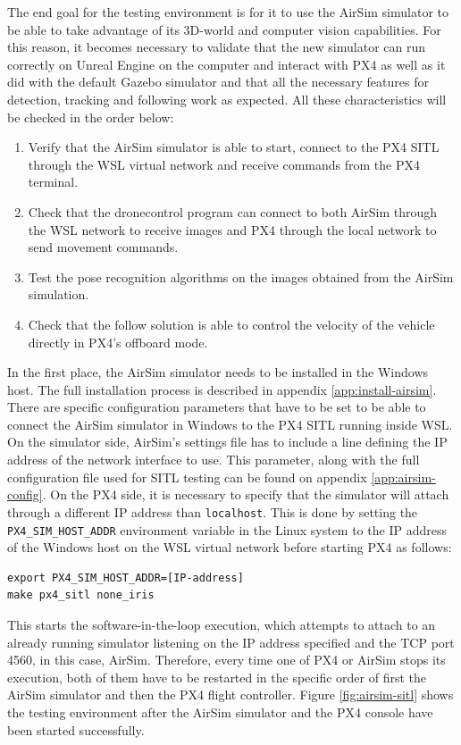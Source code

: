 The end goal for the testing environment is for it to use the AirSim simulator to be able to take advantage of its 3D-world and computer vision capabilities.
For this reason, it becomes necessary to validate that the new simulator can run correctly on Unreal Engine on the computer and interact with PX4 as well as it did with the default Gazebo simulator and that all the necessary features for detection, tracking and following work as expected.
All these characteristics will be checked in the order below:
\begin{enumerate}
    \item Verify that the AirSim simulator is able to start, connect to the PX4 SITL through the WSL virtual network and receive commands from the PX4 terminal.
    \item Check that the dronecontrol program can connect to both AirSim through the WSL network to receive images and PX4 through the local network to send movement commands.
    \item Test the pose recognition algorithms on the images obtained from the AirSim simulation.
    \item Check that the follow solution is able to control the velocity of the vehicle directly in PX4's offboard mode.
\end{enumerate}

In the first place, the AirSim simulator needs to be installed in the Windows host.
The full installation process is described in appendix \ref{app:install-airsim}.
There are specific configuration parameters that have to be set to be able to connect the AirSim simulator in Windows to the PX4 SITL running inside WSL.
On the simulator side, AirSim's settings file has to include a line defining the IP address of the network interface to use.
This parameter, along with the full configuration file used for SITL testing can be found on appendix \ref{app:airsim-config}.
On the PX4 side, it is necessary to specify that the simulator will attach through a different IP address than \verb|localhost|.
This is done by setting the \verb|PX4_SIM_HOST_ADDR| environment variable in the Linux system to the IP address of the Windows host on the WSL virtual network before starting PX4 as follows:
\begin{verbatim}
export PX4_SIM_HOST_ADDR=[IP-address]
make px4_sitl none_iris
\end{verbatim}
This starts the software-in-the-loop execution, which attempts to attach to an already running simulator listening on the IP address specified and the TCP port 4560, in this case, AirSim.
Therefore, every time one of PX4 or AirSim stops its execution, both of them have to be restarted in the specific order of first the AirSim simulator and then the PX4 flight controller.
Figure \ref{fig:airsim-sitl} shows the testing environment after the AirSim simulator and the PX4 console have been started successfully.

